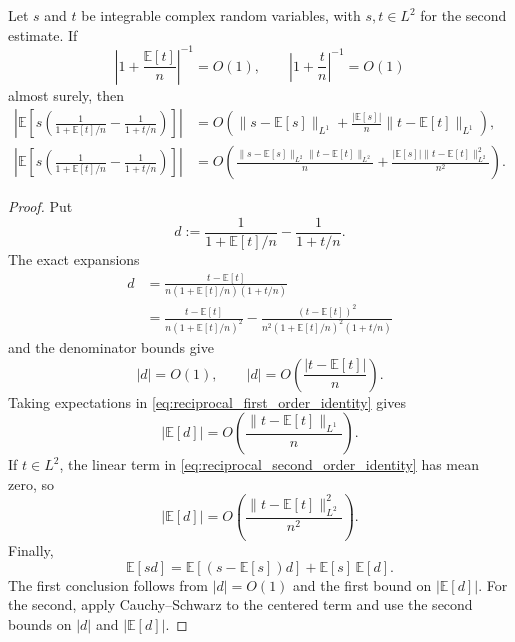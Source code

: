\documentclass[EJP, preprint, NODS, nobera, nofontexpansion]{ejpecp}
\begin{document}
\begin{lemma}
\label{lem:reciprocal_difference_estimate}
Let $s$ and $t$ be integrable complex random variables, with $s,t\in L^2$
for the second estimate. If
\[
    \left|1+\frac{\mathbb E[t]}n\right|^{-1}
    =O(1),
    \qquad
    \left|1+\frac tn\right|^{-1}
    =O(1)
\]
almost surely, then
\begin{align*}
    \left|
      \mathbb E\left[
        s\left(
          \frac1{1+\mathbb E[t]/n}
          -
          \frac1{1+t/n}
        \right)
      \right]
    \right|
    &=
    O\left(
       \|s-\mathbb E[s]\|_{L^1}
       +\frac{|\mathbb E[s]|}{n}
        \|t-\mathbb E[t]\|_{L^1}
    \right),
    \\
    \left|
      \mathbb E\left[
        s\left(
          \frac1{1+\mathbb E[t]/n}
          -
          \frac1{1+t/n}
        \right)
      \right]
    \right|
    &=
    O\left(
       \frac{\|s-\mathbb E[s]\|_{L^2}
             \|t-\mathbb E[t]\|_{L^2}}{n}
       +\frac{|\mathbb E[s]|
             \|t-\mathbb E[t]\|_{L^2}^2}{n^2}
    \right).
\end{align*}
\end{lemma}

\begin{proof}
Put
\[
    d:=
    \frac1{1+\mathbb E[t]/n}
    -
    \frac1{1+t/n}.
\]
The exact expansions
\begin{align}
    d
    &=
    \frac{t-\mathbb E[t]}
    {n(1+\mathbb E[t]/n)(1+t/n)}
    \label{eq:reciprocal_first_order_identity}
    \\
    &=
    \frac{t-\mathbb E[t]}
    {n(1+\mathbb E[t]/n)^2}
    -
    \frac{(t-\mathbb E[t])^2}
    {n^2(1+\mathbb E[t]/n)^2(1+t/n)}
    \label{eq:reciprocal_second_order_identity}
\end{align}
and the denominator bounds give
\begin{equation}\label{eq:reciprocal_lipschitz_bound}
    |d|=O(1),
    \qquad
    |d|=O\left(\frac{|t-\mathbb E[t]|}{n}\right).
\end{equation}
Taking expectations in \eqref{eq:reciprocal_first_order_identity} gives
\[
    |\mathbb E[d]|
    =O\left(\frac{\|t-\mathbb E[t]\|_{L^1}}{n}\right).
\]
If $t\in L^2$, the linear term in
\eqref{eq:reciprocal_second_order_identity} has mean zero, so
\[
    |\mathbb E[d]|
    =O\left(\frac{\|t-\mathbb E[t]\|_{L^2}^2}{n^2}\right).
\]
Finally,
\[
    \mathbb E[sd]
    =\mathbb E\left[(s-\mathbb E[s])d\right]
     +\mathbb E[s]\,\mathbb E[d].
\]
The first conclusion follows from $|d|=O(1)$ and the first bound on
$|\mathbb E[d]|$. For the second, apply Cauchy--Schwarz to the centered
term and use the second bounds on $|d|$ and $|\mathbb E[d]|$.
\end{proof}
\end{document}
